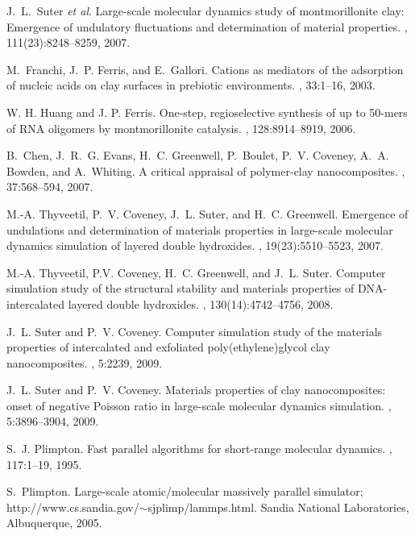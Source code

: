 \begin{thebibliography}{10}
J.~L.~Suter \emph{et al}.
\newblock Large-scale molecular dynamics study of montmorillonite clay:
  Emergence of undulatory fluctuations and determination of material
  properties.
, 111(23):8248--8259, 2007.

M.~Franchi, J.~P. Ferris, and E.~Gallori.
\newblock Cations as mediators of the adsorption of nucleic acids on clay
  surfaces in prebiotic environments.
, {33}:{1--16},
  {2003}.

W. H. Huang and J. P. Ferris.
\newblock One-step, regioselective synthesis of up to 50-mers of {RNA}
  oligomers by montmorillonite catalysis.
, {128}:{8914--8919},
  {2006}.

B.~Chen, J.~R.~G. Evans, H.~C. Greenwell, P.~Boulet, P.~V. Coveney, A.~A.
  Bowden, and A.~Whiting.
\newblock A critical appraisal of polymer-clay nanocomposites.
, 37:568--594, 2007.

M.-A. Thyveetil, P.~V. Coveney, J.~L. Suter, and H.~C. Greenwell.
\newblock Emergence of undulations and determination of materials properties in
  large-scale molecular dynamics simulation of layered double hydroxides.
, 19(23):5510--5523, 2007.

M.-A. Thyveetil, P.V. Coveney, H.~C. Greenwell, and J.~L. Suter.
\newblock Computer simulation study of the structural stability and materials
  properties of {DNA}-intercalated layered double hydroxides.
, 130(14):4742--4756, 2008.

J.~L. Suter and P.~V. Coveney.
\newblock Computer simulation study of the materials properties of intercalated
  and exfoliated poly(ethylene)glycol clay nanocomposites.
, 5:2239, 2009.

J.~L. Suter and P.~V. Coveney.
\newblock Materials properties of clay nanocomposites: onset of negative
  {Poisson} ratio in large-scale molecular dynamics simulation.
, 5:3896--3904, 2009.

S.~J. Plimpton.
\newblock Fast parallel algorithms for short-range molecular dynamics.
, 117:1--19, 1995.

S.~Plimpton.
\newblock Large-scale atomic/molecular massively parallel simulator;
  http://www.cs.sandia.gov/$\sim$sjplimp/lammps.html.
\newblock Sandia National Laboratories, Albuquerque, 2005.


\end{thebibliography}

